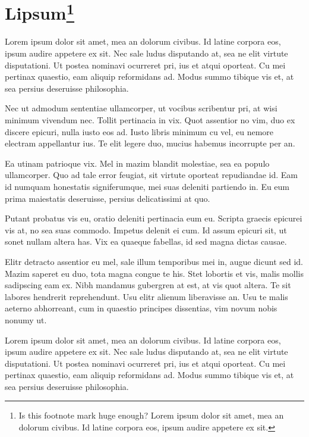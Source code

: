 \documentclass[twoside, 12pt]{article}
\begin{document}
    \section{Lipsum\texorpdfstring{\footnote[99]{Is this footnote mark huge enough? 
    Lorem ipsum dolor sit amet, mea an dolorum civibus. Id latine corpora eos, ipsum audire appetere ex sit.}}{}}
    \label{sec3}
    Lorem ipsum dolor sit amet, mea an dolorum civibus. Id latine corpora eos, ipsum audire appetere ex sit. 
    Nec sale ludus disputando at, sea ne elit virtute disputationi. Ut postea nominavi ocurreret pri, ius et atqui oporteat. 
    Cu mei pertinax quaestio, eam aliquip reformidans ad. Modus summo tibique vis et, at sea persius deseruisse philosophia.

    Nec ut admodum sententiae ullamcorper, ut vocibus scribentur pri, at wisi minimum vivendum nec. Tollit pertinacia in vix. 
    Quot assentior no vim, duo ex discere epicuri, nulla iusto eos ad. Iusto libris minimum cu vel, eu nemore electram appellantur ius. 
    Te elit legere duo, mucius habemus incorrupte per an.

    Ea utinam patrioque vix. Mel in mazim blandit molestiae, sea ea populo ullamcorper. Quo ad tale error feugiat, 
    sit virtute oporteat repudiandae id. Eam id numquam honestatis signiferumque, mei suas deleniti partiendo in. 
    Eu eum prima maiestatis deseruisse, persius delicatissimi at quo.

    Putant probatus vis eu, oratio deleniti pertinacia eum eu. Scripta graecis epicurei vis at, no sea suas commodo. 
    Impetus delenit ei cum. Id assum epicuri sit, ut sonet nullam altera has. Vix ea quaeque fabellas, id sed magna dictas causae.

    Elitr detracto assentior eu mel, sale illum temporibus mei in, augue dicunt sed id. Mazim saperet eu duo, 
    tota magna congue te his. Stet lobortis et vis, malis mollis sadipscing eam ex. Nibh mandamus gubergren at est, 
    at vis quot altera. Te sit labores hendrerit reprehendunt. Usu elitr alienum liberavisse an. Usu te malis aeterno 
    abhorreant, cum in quaestio principes dissentias, vim novum nobis nonumy ut.

    Lorem ipsum dolor sit amet, mea an dolorum civibus. Id latine corpora eos, ipsum audire appetere ex sit. 
    Nec sale ludus disputando at, sea ne elit virtute disputationi. Ut postea nominavi ocurreret pri, ius et atqui oporteat. 
    Cu mei pertinax quaestio, eam aliquip reformidans ad. Modus summo tibique vis et, at sea persius deseruisse philosophia.
\end{document}
